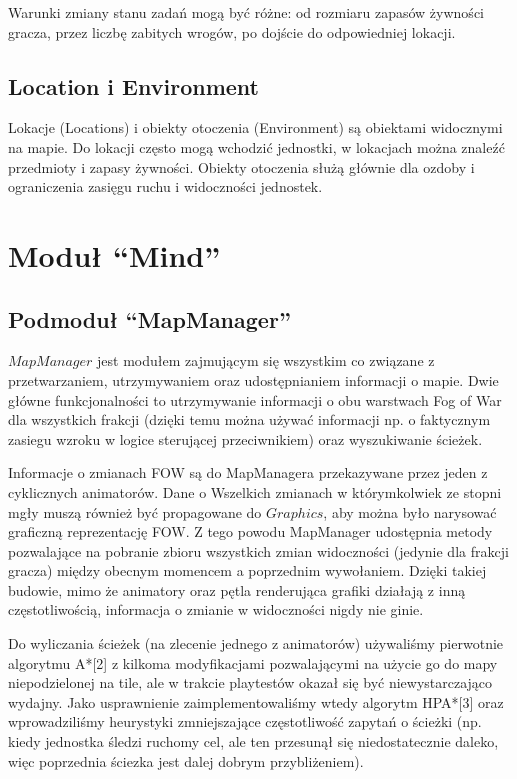 \documentclass[licencjacka]{pracamgr}
\begin{document}
      Warunki zmiany stanu zadań mogą być różne: od rozmiaru zapasów żywności gracza, przez liczbę zabitych wrogów, po
      dojście do odpowiedniej lokacji.

    \subsection{Location i Environment}
      Lokacje (Locations) i obiekty otoczenia (Environment) są obiektami widocznymi na mapie. Do lokacji często mogą
      wchodzić jednostki, w lokacjach można znaleźć przedmioty i zapasy żywności. Obiekty otoczenia służą głównie dla
      ozdoby i ograniczenia zasięgu ruchu i widoczności jednostek.

  \section{Moduł ``Mind''}
    \subsection{Podmoduł ``MapManager''}
    $MapManager$ jest modułem zajmującym się wszystkim co związane z przetwarzaniem, utrzymywaniem oraz udostępnianiem
    informacji o mapie. Dwie główne funkcjonalności to utrzymywanie informacji o obu warstwach Fog of War dla wszystkich
    frakcji (dzięki temu można używać informacji np. o faktycznym zasiegu wzroku w logice sterującej przeciwnikiem) oraz
    wyszukiwanie ścieżek.

    Informacje o zmianach FOW są do MapManagera przekazywane przez jeden z cyklicznych animatorów. Dane o Wszelkich
    zmianach w którymkolwiek ze stopni mgły muszą również być propagowane do $Graphics$, aby można było narysować
    graficzną reprezentację FOW. Z tego powodu MapManager udostępnia metody pozwalające na pobranie zbioru wszystkich
    zmian widoczności (jedynie dla frakcji gracza) między obecnym momencem a poprzednim wywołaniem. Dzięki takiej
    budowie, mimo że animatory oraz pętla renderująca grafiki działają z inną częstotliwością, informacja o zmianie w
    widoczności nigdy nie ginie.

    Do wyliczania ścieżek (na zlecenie jednego z animatorów) używaliśmy pierwotnie algorytmu A*[2] z kilkoma
    modyfikacjami pozwalającymi na użycie go do mapy niepodzielonej na tile, ale w trakcie playtestów okazał się być
    niewystarczająco wydajny. Jako usprawnienie zaimplementowaliśmy wtedy algorytm HPA*[3] oraz wprowadziliśmy
    heurystyki zmniejszające częstotliwość zapytań o ścieżki (np. kiedy jednostka śledzi ruchomy cel, ale ten przesunął
    się niedostatecznie daleko, więc poprzednia ściezka jest dalej dobrym przybliżeniem).
\end{document}

